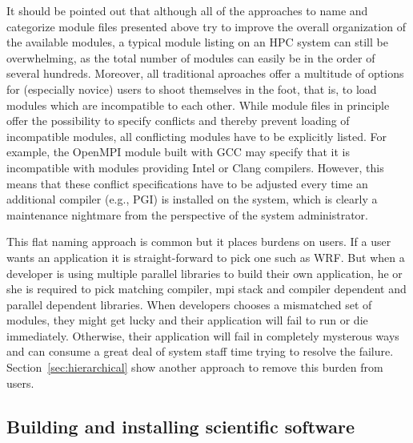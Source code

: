 It should be pointed out that although all of the approaches to name and
categorize module files presented above try to improve the overall
organization of the available modules, a typical module listing on an HPC
system can still be overwhelming, as the total number of modules can easily
be in the order of several hundreds. Moreover, all traditional aproaches offer a
multitude of options for (especially novice) users to shoot themselves in the
foot, that is, to load modules which are incompatible to each other. While
module files in principle offer the possibility to specify conflicts and
thereby prevent loading of incompatible modules, all conflicting modules have
to be explicitly listed. For example, the OpenMPI module built with GCC may
specify that it is incompatible with modules providing Intel or Clang
compilers. However, this means that these conflict specifications have to be
adjusted every time an additional compiler (e.g., PGI) is installed on the
system, which is clearly a maintenance nightmare from the perspective of the
system administrator.

This flat naming approach is common but it places burdens on users.
If a user wants an application it is straight-forward to pick one such
as WRF.  But when a developer is using multiple parallel libraries to
build their own application, he or she is required to pick matching
compiler, mpi stack and compiler dependent and parallel dependent
libraries.  When developers chooses a mismatched set of modules, they
might get lucky and their application will fail to run or die
immediately.  Otherwise, their application will fail in completely
mysterous ways and can consume a great deal of system staff time
trying to resolve the failure.  Section~\ref{sec:hierarchical} show
another approach to remove this burden from users.


%
%


\subsection{Building and installing scientific software}
\label{sec:installing}

